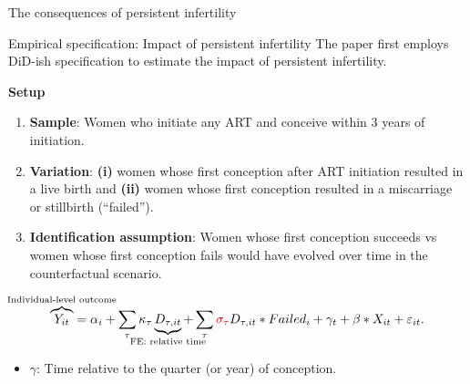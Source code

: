 \documentclass[notes,11pt, aspectratio=169]{beamer}
\begin{document}
\begin{frame}
	\begin{center}
		\huge{The consequences of persistent infertility}
	\end{center}
\end{frame}

\begin{frame}{Empirical specification: Impact of persistent infertility}
	\vspace{1em}
	The paper first employs DiD-ish specification to estimate the impact of persistent infertility.
	\vspace{1em}
	\begin{block}{\textbf{Setup}}
		\begin{enumerate}
			\item \textbf{Sample}: Women who initiate any ART and conceive within 3 years of initiation.
			\item \textbf{Variation}: \textbf{(i)} women whose first conception after ART initiation resulted in a live birth and \textbf{(ii)} women whose first conception resulted in a miscarriage or stillbirth (``failed'').
			\item \textbf{Identification assumption}: Women whose first conception succeeds vs women whose first conception fails would have evolved over time in the counterfactual scenario.
		\end{enumerate}	
	\end{block}
	\begin{align*}
		\overbrace{Y_{it}}^{\hidewidth \text{Individual-level outcome} \hidewidth} = \alpha_i + \sum_{\tau} \kappa_{\tau} \underbrace{D_{\tau, it}}_{\hidewidth \text{FE: relative time} \hidewidth} + \sum_{\tau} \textcolor{red}{\sigma_{\tau}} D_{\tau,it} * Failed_i + \gamma_t + \beta * X_{it} + \varepsilon_{it}.
	\end{align*}

	\begin{itemize}
		\item $\gamma$: Time relative to the quarter (or year) of conception.
	\end{itemize}
\end{frame}
\end{document}
